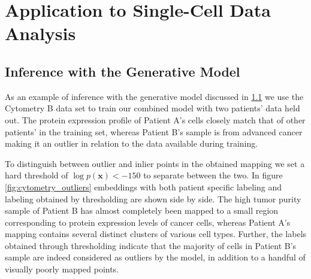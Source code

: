 \section{Application to Single-Cell Data Analysis}
\label{section:applications}

\subsection{Inference with the Generative Model}
\label{section:inference_with_the_generative_model}

As an example of inference with the generative model discussed in \ref{section:inference_with_the_generative_model} we use the Cytometry B data set to train our combined model with two patients' data held out. The protein expression profile of Patient A's cells closely match that of other patients' in the training set, whereas Patient B's sample is from advanced cancer making it an outlier in relation to the data available during training.

To distinguish between outlier and inlier points in the obtained mapping we set a hard threshold of $\log p(\mathbf{x}) < -150$ to separate between the two. In figure \ref{fig:cytometry_outliers} embeddings with both patient specific labeling and labeling obtained by thresholding are shown side by side. The high tumor purity sample of Patient B has almost completely been mapped to a small region corresponding to protein expression levels of cancer cells, whereas Patient A's mapping contains several distinct clusters of various cell types. Further, the labels obtained through thresholding indicate that the majority of cells in Patient B's sample are indeed considered as outliers by the model, in addition to a handful of visually poorly mapped points.

